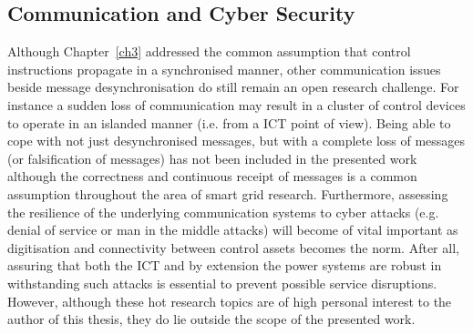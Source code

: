 \subsection{Communication and Cyber Security}

Although Chapter~\ref{ch3} addressed the common assumption that control instructions propagate in a synchronised manner, other communication issues beside message desynchronisation do still remain an open research challenge.
For instance a sudden loss of communication may result in a cluster of control devices to operate in an islanded manner (i.e. from a ICT point of view).
Being able to cope with not just desynchronised messages, but with a complete loss of messages (or falsification of messages) has not been included in the presented work although the correctness and continuous receipt of messages is a common assumption throughout the area of smart grid research.
Furthermore, assessing the resilience of the underlying communication systems to cyber attacks (e.g. denial of service or man in the middle attacks) will become of vital important as digitisation and connectivity between control assets becomes the norm.
After all, assuring that both the ICT and by extension the power systems are robust in withstanding such attacks is essential to prevent possible service disruptions.
However, although these hot research topics are of high personal interest to the author of this thesis, they do lie outside the scope of the presented work.
